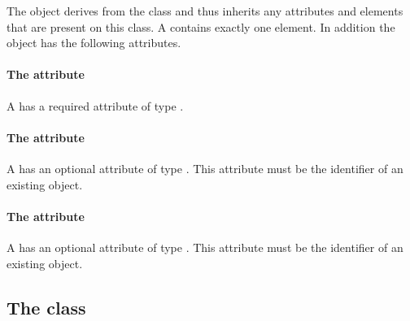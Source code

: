 The \CSGSetOperator object derives from the \CSGNode class and thus
inherits any attributes and elements that are present on this class.
A \CSGSetOperator contains exactly one \ListOfCSGNodes element.
In addition the \CSGSetOperator object has the following attributes.

\paragraph{The \fixttspace{} attribute}

A \CSGSetOperator has a required attribute  of type
.


\paragraph{The \fixttspace{} attribute}

A \CSGSetOperator has an optional attribute  of type
.
This attribute must be the identifier of an existing \CSGNode object.


\paragraph{The \fixttspace{} attribute}

A \CSGSetOperator has an optional attribute  of type
.
This attribute must be the identifier of an existing \CSGNode object.


\subsection{The  class}
\label{mixedgeometry-class}




